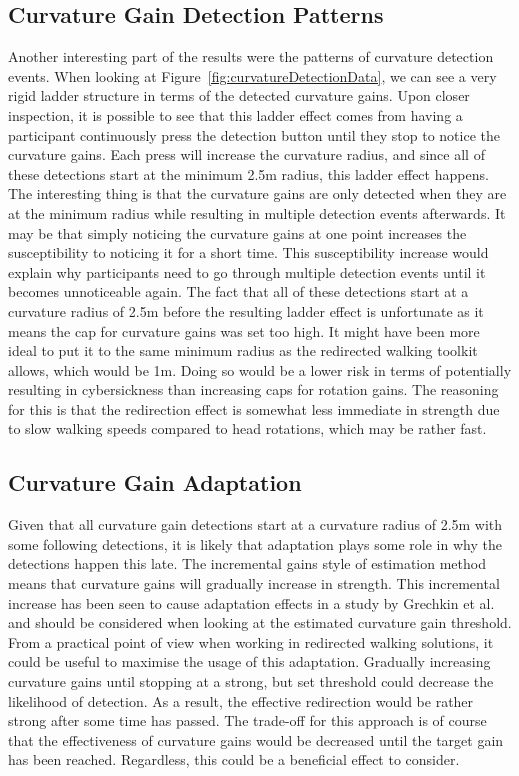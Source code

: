 \subsection{Curvature Gain Detection Patterns}
Another interesting part of the results were the patterns of curvature detection events. When looking at Figure~\ref{fig:curvatureDetectionData}, we can see a very rigid ladder structure in terms of the detected curvature gains. Upon closer inspection, it is possible to see that this ladder effect comes from having a participant continuously press the detection button until they stop to notice the curvature gains. Each press will increase the curvature radius, and since all of these detections start at the minimum 2.5m radius, this ladder effect happens. The interesting thing is that the curvature gains are only detected when they are at the minimum radius while resulting in multiple detection events afterwards. It may be that simply noticing the curvature gains at one point increases the susceptibility to noticing it for a short time. This susceptibility increase would explain why participants need to go through multiple detection events until it becomes unnoticeable again. The fact that all of these detections start at a curvature radius of 2.5m before the resulting ladder effect is unfortunate as it means the cap for curvature gains was set too high. It might have been more ideal to put it to the same minimum radius as the redirected walking toolkit allows, which would be 1m. Doing so would be a lower risk in terms of potentially resulting in cybersickness than increasing caps for rotation gains. The reasoning for this is that the redirection effect is somewhat less immediate in strength due to slow walking speeds compared to head rotations, which may be rather fast. 

\subsection{Curvature Gain Adaptation}
Given that all curvature gain detections start at a curvature radius of 2.5m with some following detections, it is likely that adaptation plays some role in why the detections happen this late. The incremental gains style of estimation method means that curvature gains will gradually increase in strength. This incremental increase has been seen to cause adaptation effects in a study by Grechkin et al.~\cite{grechkin2016revisiting} and should be considered when looking at the estimated curvature gain threshold. From a practical point of view when working in redirected walking solutions, it could be useful to maximise the usage of this adaptation. Gradually increasing curvature gains until stopping at a strong, but set threshold could decrease the likelihood of detection. As a result, the effective redirection would be rather strong after some time has passed. The trade-off for this approach is of course that the effectiveness of curvature gains would be decreased until the target gain has been reached. Regardless, this could be a beneficial effect to consider.

